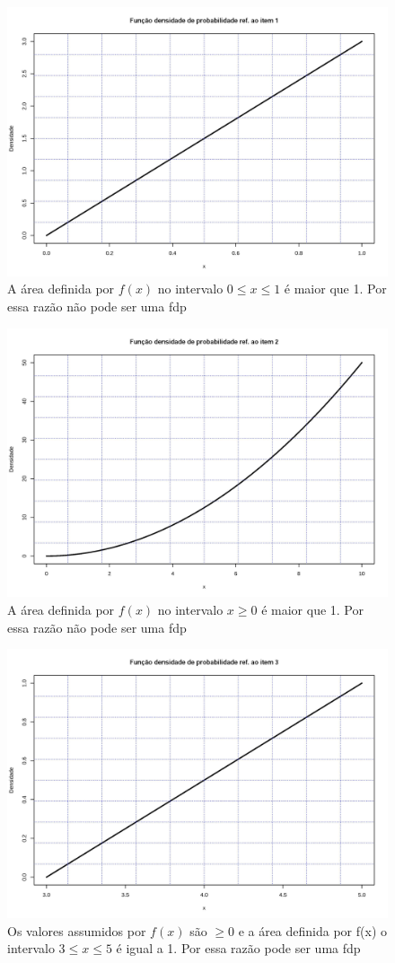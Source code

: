 \documentclass[
]{book}
\begin{document}
\begin{figure}

{\centering \includegraphics[width=0.6\linewidth]{images6/item1} 

}

\caption{A área definida por $f(x)$ no intervalo $0 \le x \le 1$ é maior que 1. Por essa razão não pode ser uma fdp}\label{fig:fig16}
\end{figure}

\hfill\break

\begin{figure}

{\centering \includegraphics[width=0.6\linewidth]{images6/item2} 

}

\caption{A área definida por $f(x)$ no intervalo $x \ge 0$ é maior que 1. Por essa razão não pode ser uma fdp}\label{fig:fig17}
\end{figure}

\hfill\break

\begin{figure}

{\centering \includegraphics[width=0.6\linewidth]{images6/item3} 

}

\caption{Os valores assumidos por $f(x)$ são $\ge 0$ e a área definida por f(x) o intervalo $3 \le x \le 5$ é igual a 1. Por essa razão pode ser uma fdp}\label{fig:fig18}
\end{figure}
\end{document}
